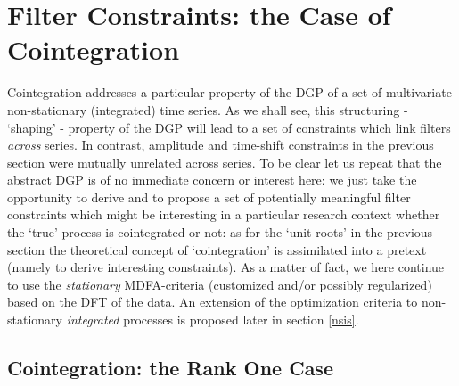 \documentclass[11pt]{article}
\begin{document}
\section{Filter Constraints: the Case of Cointegration}\label{coint_sec}

Cointegration addresses a particular property of the DGP of a set of multivariate non-stationary (integrated) time series. As we shall see, this structuring - `shaping' - property of the DGP will lead to a set of constraints which link filters \emph{across} series. In contrast, amplitude and time-shift constraints in the previous section were mutually unrelated across series. To be clear let us repeat that the abstract DGP is of no immediate concern or interest here: we just take the opportunity to derive and to propose a set of potentially meaningful filter constraints which might be interesting in a particular research context whether the `true' process is cointegrated or not: as for the `unit roots' in the previous section  the theoretical concept of `cointegration' is assimilated into a pretext (namely to derive interesting constraints). As a matter of fact, we here continue to use the \emph{stationary} MDFA-criteria (customized and/or possibly regularized) based on the DFT of the data. An extension of the optimization criteria to non-stationary \emph{integrated} processes is proposed later in section \ref{nsis}.

\subsection{Cointegration: the Rank One Case}\label{rank1}
\end{document}
